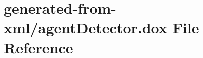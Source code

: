 \hypertarget{agentDetector_8dox}{}\section{generated-\/from-\/xml/agent\+Detector.dox File Reference}
\label{agentDetector_8dox}
